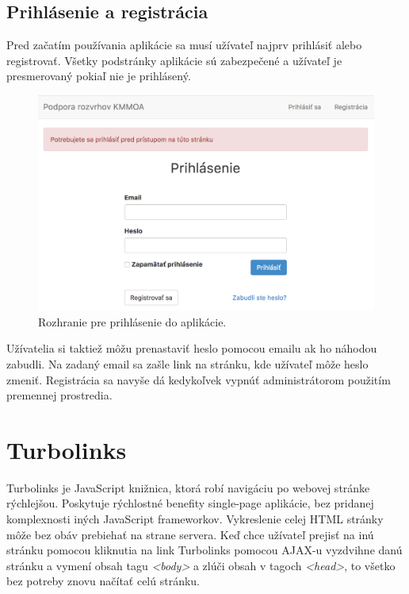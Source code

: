 \subsection{Prihlásenie a registrácia}

Pred začatím používania aplikácie sa musí užívateľ najprv prihlásiť alebo registrovať. Všetky podstránky aplikácie sú zabezpečené a užívateľ je presmerovaný pokiaľ nie je prihlásený.

\begin{figure}[!htb]
  \centering
    \includegraphics[width=1\textwidth]{content/images/login}
    \caption{Rozhranie pre prihlásenie do aplikácie.}
\end{figure}

Užívatelia si taktiež môžu prenastaviť heslo pomocou emailu ak ho náhodou zabudli. Na zadaný email sa zašle link na stránku, kde užívateľ môže heslo zmeniť. Registrácia sa navyše dá kedykoľvek vypnúť administrátorom použitím premennej prostredia.

\clearpage
\section{Turbolinks}

Turbolinks je JavaScript knižnica, ktorá robí navigáciu po webovej stránke rýchlejšou. Poskytuje rýchlostné benefity single-page aplikácie, bez pridanej komplexnosti iných JavaScript frameworkov. Vykreslenie celej HTML stránky môže bez obáv prebiehať na strane servera. Keď chce užívateľ prejisť na inú stránku pomocou kliknutia na link Turbolinks pomocou AJAX-u vyzdvihne danú stránku a vymení obsah tagu \emph{<body>} a zlúči obsah v tagoch \emph{<head>}, to všetko bez potreby znovu načítať celú stránku. \citep{web:turbolinks}

